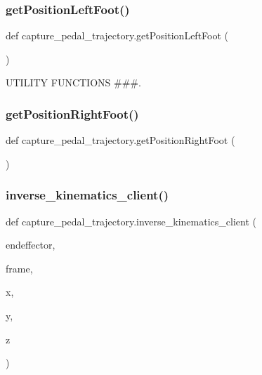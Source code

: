 \subsubsection{\texorpdfstring{getPositionLeftFoot()}{getPositionLeftFoot()}}
{\footnotesize\ttfamily def capture\+\_\+pedal\+\_\+trajectory.\+get\+Position\+Left\+Foot (\begin{DoxyParamCaption}{ }\end{DoxyParamCaption})}



U\+T\+I\+L\+I\+TY F\+U\+N\+C\+T\+I\+O\+NS \#\#\#. 

\mbox{\label{namespacecapture__pedal__trajectory_abd2b89d215476e10e9079f6f971a669c}} 
\subsubsection{\texorpdfstring{getPositionRightFoot()}{getPositionRightFoot()}}
{\footnotesize\ttfamily def capture\+\_\+pedal\+\_\+trajectory.\+get\+Position\+Right\+Foot (\begin{DoxyParamCaption}{ }\end{DoxyParamCaption})}

\mbox{\label{namespacecapture__pedal__trajectory_affbe4020d535c4967511b40d3aef141d}} 
\subsubsection{\texorpdfstring{inverse\_kinematics\_client()}{inverse\_kinematics\_client()}}
{\footnotesize\ttfamily def capture\+\_\+pedal\+\_\+trajectory.\+inverse\+\_\+kinematics\+\_\+client (\begin{DoxyParamCaption}\item[{}]{endeffector,  }\item[{}]{frame,  }\item[{}]{x,  }\item[{}]{y,  }\item[{}]{z }\end{DoxyParamCaption})}

